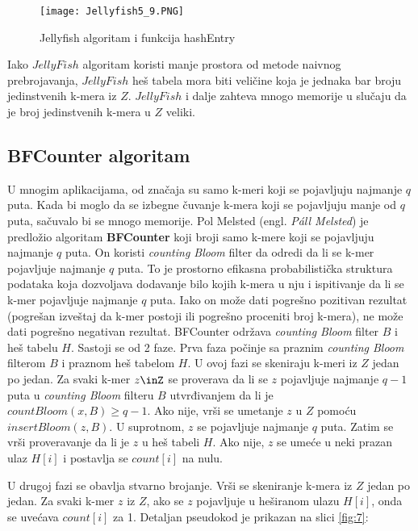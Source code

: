 \documentclass[12pt,oneside]{memoir}
\begin{document}
\begin{figure}[!ht]
  \centering
  \texttt{[image: Jellyfish5\_9.PNG]}
  \caption{Jellyfish algoritam i funkcija hashEntry}
  \label{fig:6}
\end{figure}

Iako $JellyFish$ algoritam koristi manje prostora od metode naivnog prebrojavanja, $JellyFish$ heš tabela mora biti veličine koja je jednaka bar broju jedinstvenih k-mera iz $Z$. $JellyFish$ i dalje zahteva mnogo memorije u slučaju da je broj jedinstvenih k-mera u $Z$ veliki.

\newpage

\subsection{BFCounter algoritam}
U mnogim aplikacijama, od značaja su samo k-meri koji se pojavljuju najmanje $q$ puta. Kada bi moglo da se izbegne čuvanje k-mera koji se pojavljuju manje od $q$ puta, sačuvalo bi se mnogo memorije. Pol Melsted (engl. \textit{Páll Melsted}) je predložio algoritam  \textbf{BFCounter} koji broji samo k-mere koji se pojavljuju najmanje $q$ puta. On koristi \textit{counting Bloom} filter da odredi da li se k-mer pojavljuje najmanje $q$ puta. To je prostorno efikasna probabilistička struktura podataka koja dozvoljava dodavanje bilo kojih k-mera u nju i ispitivanje da li se k-mer pojavljuje najmanje $q$ puta. Iako on može dati pogrešno pozitivan rezultat (pogrešan izveštaj da k-mer postoji ili pogrešno proceniti broj k-mera), ne može dati pogrešno negativan rezultat. BFCounter održava \textit{counting Bloom} filter $B$ i heš tabelu $H$. Sastoji se od 2 faze. Prva faza počinje sa praznim \textit{counting Bloom} filterom $B$ i praznom heš tabelom $H$. U ovoj fazi se skeniraju k-meri iz $Z$ jedan po jedan. Za svaki k-mer $z\inZ$ se proverava da li se $z$ pojavljuje najmanje $q - 1$ puta u \textit{counting Bloom} filteru $B$ utvrđivanjem da li je $countBloom(x, B) \geq q-1$. Ako nije, vrši se umetanje $z$ u $Z$ pomoću $insertBloom(z, B)$. U suprotnom, $z$ se pojavljuje najmanje $q$ puta. Zatim se vrši proveravanje da li je $z$ u heš tabeli $H$. Ako nije, $z$ se umeće u neki prazan ulaz $H[i]$ i postavlja se $count[i]$ na nulu.

U drugoj fazi se obavlja stvarno brojanje. Vrši se skeniranje k-mera iz $Z$ jedan po jedan. Za svaki k-mer $z$ iz $Z$, ako se $z$ pojavljuje u heširanom ulazu $H[i]$, onda se uvećava $count[i]$ za 1. Detaljan pseudokod je prikazan na slici \ref{fig:7}:
\end{document}
